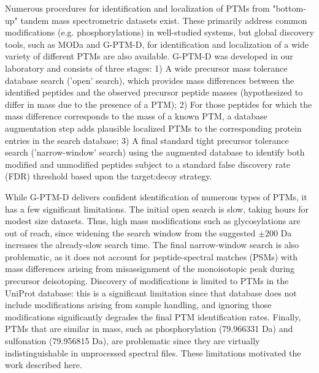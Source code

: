 \documentclass[journal=jprobs,manuscript=article]{achemso}
\begin{document}
Numerous procedures for identification and localization of PTMs from "bottom-up" tandem mass spectrometric datasets exist.
These primarily address common modifications (e.g. phosphorylations) in well-studied systems, but global discovery tools, such as MODa\citep{Na_2011} and G-PTM-D\citep{Li_2016}, for identification and localization of a wide variety of different PTMs are also available.
G-PTM-D was developed in our laboratory and consists of three stages: 1) A wide precursor mass tolerance database search ('open' search)\citep{Chick_2015, Na_2011}, which provides mass differences between the identified peptides and the observed precursor peptide masses (hypothesized to differ in mass due to the presence of a PTM);
2) For those peptides for which the mass difference corresponds to the mass of a known PTM, a database augmentation step adds plausible localized PTMs to the corresponding protein entries in the search database;
3) A final standard tight precursor tolerance search ('narrow-window' search) using the augmented database to identify both modified and unmodified peptides subject to a standard false discovery rate (FDR) threshold based upon the target:decoy strategy\citep{Elias_2007}.

While G-PTM-D delivers confident identification of numerous types of PTMs, it has a few significant limitations.
The initial open search is slow, taking hours for modest size datasets.
Thus, high mass modifications such as glycosylations are out of reach, since widening the search window from the suggested $\pm 200$ Da increases the already-slow search time.
The final narrow-window search is also problematic, as it does not account for peptide-spectral matches (PSMs) with mass differences arising from misassignment of the monoisotopic peak during precursor deisotoping.
Discovery of modifications is limited to PTMs in the UniProt database: this is a significant limitation since that database does not include modifications arising from sample handling, and ignoring those modifications significantly degrades the final PTM identification rates.
Finally, PTMs that are similar in mass, such as phosphorylation (79.966331 Da) and sulfonation (79.956815 Da), are problematic since they are virtually indistinguishable in unprocessed spectral files.
These limitations motivated the work described here.
\end{document}
